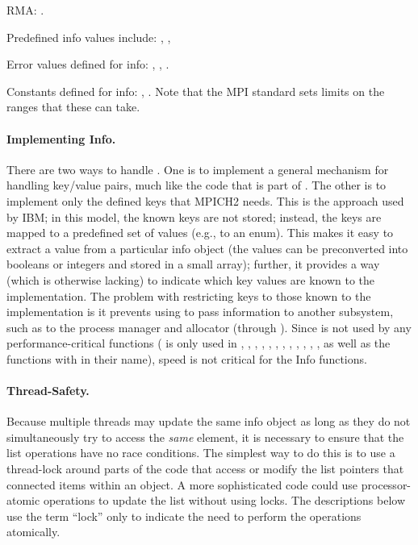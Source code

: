 \documentclass{article}
\begin{document}
RMA:
.

Predefined info values include:
, 
, 


Error values defined for info:
,
,
.

Constants defined for info: 
,
.
Note that the MPI standard sets limits on the ranges that these can take.

\paragraph{Implementing Info.}
There are two ways to handle .  One is to implement a general
mechanism for handling key/value pairs, much like the code that is part of
.  The other is to implement only the defined keys that
MPICH2 needs.  This is the approach used by IBM; in this model, the known keys
are not stored; instead, the keys are mapped to a predefined set of values
(e.g., to an enum).  This makes it easy to extract a value from a particular
info object (the values can be preconverted into booleans or integers and
stored in a small array); further, it provides a way (which is otherwise
lacking) to 
indicate which key values are known to the implementation.  
The problem with restricting keys to those known to the implementation is it
prevents using  to pass information to another subsystem, such
as to the process manager and allocator (through ). 
Since  is not used by any performance-critical functions
( is only used in , ,
, 
, , ,
, , ,
, , 
, as well as the functions with  in their
name), speed is not critical for the Info functions.

\paragraph{Thread-Safety.}
Because multiple threads may update the same info object as long as
they do not simultaneously try to access the \emph{same} element, it
is necessary to ensure that the list operations have no race
conditions.  The simplest way to do this is to use a thread-lock
around parts of the code that access or modify the list pointers that
connected items within an  object.  A more sophisticated code
could use processor-atomic operations to update the list without using locks.
The descriptions below use the term ``lock'' only to indicate the need to
perform the operations atomically.
\end{document}
